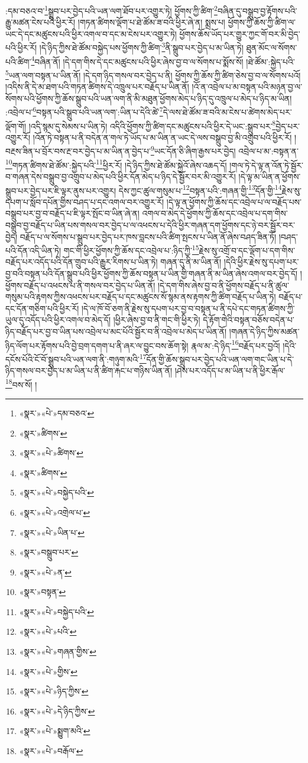 :དམ་བཅའ་བ་\footnote{«སྣར་»«པེ་»དམ་བཅའ་}སྒྲུབ་པར་བྱེད་པའི་ཡན་ལག་ཐོབ་པར་འགྱུར་ཏེ། ཕྱོགས་ཀྱི་ཚིག་\footnote{«སྣར་»ཚིགས་}བཞིན་དུ་བསྒྲུབ་བྱ་རྟོགས་པའི་རྒྱུ་མཚན་ངེས་པའི་ཕྱིར་རོ། །གཏན་ཚིགས་ལྡོག་པ་ཐེ་ཚོམ་ཟ་བའི་ཕྱིར་ཞེ་ན། སྨྲས་པ། ཕྱོགས་ཀྱི་ཆོས་ཀྱི་ཚིག་ལ་ཡང་དེ་དང་མཚུངས་པའི་ཕྱིར་འགལ་བ་དང་མ་ངེས་པར་འགྱུར་ཏེ། ཕྱོགས་ཆོས་ཡོད་པར་གྱུར་ཀྱང་གོ་བར་མི་བྱེད་པའི་ཕྱིར་རོ། །དེ་ཉིད་ཀྱིས་ཐེ་ཚོམ་བསྐྱེད་པས་ཕྱོགས་ཀྱི་ཚིག་\footnote{«སྣར་»«པེ་»ཚིགས་}ནི་སྒྲུབ་པར་བྱེད་པ་མ་ཡིན་ཏེ། ཐུན་མོང་ལ་སོགས་པའི་ཚིག་\footnote{«སྣར་»ཚིགས་}བཞིན་ནོ། །དེ་དག་གིས་དེ་དང་མཚུངས་པའི་ཕྱིར་ཞེས་བྱ་བ་ལ་སོགས་པ་སྨོས་སོ། །ཐེ་ཚོམ་:སྐྱེད་པའི་\footnote{«སྣར་»«པེ་»བསྐྱེད་པའི་}ཡན་ལག་བསྟན་པ་ཡིན་ནོ། །དེ་དག་ཉིད་གསལ་བར་བྱེད་པ་ནི། ཕྱོགས་ཀྱི་ཆོས་ཀྱི་ཚིག་ཅེས་བྱ་བ་ལ་སོགས་པའོ། །འདིས་ནི་དེ་མ་ཐག་པའི་གཏན་ཚིགས་དེ་འཁྲུལ་པར་བརྗོད་པ་ཡིན་ནོ། །འོ་ན་འབྲེལ་པ་མ་བསྟན་པའི་མཉན་བྱ་ལ་སོགས་པའི་ཕྱོགས་ཀྱི་ཆོས་སྒྲུབ་པའི་ཡན་ལག་ནི་མི་མཐུན་ཕྱོགས་མེད་པ་ཉིད་དུ་འཁྲུལ་པ་མེད་པ་ཉིད་མ་ཡིན། :འབྲེལ་པ་\footnote{«སྣར་»«པེ་»འགྲེལ་པ་}བསྟན་པའི་སྒྲུབ་པའི་ཡན་ལག་:ཡིན་པ་དེའི་ཚེ་\footnote{«སྣར་»«པེ་»ཡིན་པ་}དེ་ལས་ཐེ་ཚོམ་ཟ་བའི་མ་ངེས་པ་ཚེགས་མེད་པར་ལྡོག་གོ། །འདི་སྙམ་དུ་སེམས་པ་ཡིན་ཏེ། འདིའི་ཕྱོགས་ཀྱི་ཚིག་དང་མཚུངས་པའི་ཕྱིར་དེ་ཡང་:སྒྲུབ་པར་\footnote{«སྣར་»བསྒྲུབ་པར་}བྱེད་པར་འགྱུར་རོ། །འོན་ཏེ་བསྟན་པ་ནི་བདེན་ན་གལ་ཏེ་ཡོད་པ་མ་ཡིན་ན་ཡང་དེ་ལས་བསྒྲུབ་བྱ་མི་འགྲུབ་པའི་ཕྱིར་རོ། །བརྔས་ཟིན་པ་བྲོར་བས་རྔ་བར་བྱེད་པ་མ་ཡིན་ན་བྱེད་པ་\footnote{«སྣར་»«པེ་»ན་}ཡང་དོན་ཅི་ཞིག་རྒྱས་པར་བྱེད། འབྲེལ་པ་མ་:བསྟན་ན་\footnote{«སྣར་»བསྟན་}གཏན་ཚིགས་ཐེ་ཚོམ་:སྐྱེད་པའི་\footnote{«སྣར་»«པེ་»བསྐྱེད་པའི་}ཕྱིར་རོ། །དེ་ཉིད་ཀྱིས་ཐེ་ཚོམ་སྐྱེའོ་ཞེས་འཆད་དོ། །གལ་ཏེ་དེ་ལྟ་ན་འོན་ཏེ་སྦྱོར་བ་གཞན་དེས་བསྒྲུབ་བྱ་འགྲུབ་པ་མེད་པའི་ཕྱིར་དོན་མེད་པ་ཉིད་དེ་སྦྱོར་བར་མི་འགྱུར་རོ། །དེ་ལྟ་མ་ཡིན་ན་ཕྱོགས་སྒྲུབ་པར་བྱེད་པར་ཇི་ལྟར་ནུས་པར་འགྱུར། དེས་ཀྱང་ཚུལ་གསུམ་པ་\footnote{«སྣར་»«པེ་»པའི་}བསྟན་པའི་:གཞན་གྱི་\footnote{«སྣར་»«པེ་»གཞན་གྱིས་}དོན་གྱི་\footnote{«སྣར་»«པེ་»གྱིས་}རྗེས་སུ་དཔག་པ་སློབ་དཔོན་གྱིས་བཤད་པ་དང་འགལ་བར་འགྱུར་རོ། །དེ་ལྟ་ན་ཕྱོགས་ཀྱི་ཆོས་དང་འབྲེལ་པ་ལ་བརྗོད་པས་བསྒྲུབ་པར་བྱ་བ་བརྗོད་པ་ཇི་ལྟར་སྤོང་བ་ཡིན་ཞེ་ན། འགལ་བ་མེད་དེ་ཕྱོགས་ཀྱི་ཆོས་དང་འབྲེལ་པ་དག་གིས་བསྒྲུབ་བྱ་བརྗོད་པ་ཡིན་པས་གསལ་བར་བྱེད་པ་ལ་འཕངས་པ་དེའི་ཕྱིར་གཞན་དག་ཕྱོགས་དང་ཉེ་བར་སྦྱོར་བར་བྱེད། བརྗོད་པ་ལ་སོགས་པ་སྒྲུབ་པར་བྱེད་པར་ཁས་བླངས་པའི་ཚིག་སྤངས་པ་ཡིན་ནོ་ཞེས་བཤད་ཟིན་ཏོ། །བཤད་པའི་དོན་འདི་ཡིན་ཏེ། གང་གི་ཕྱིར་ཕྱོགས་ཀྱི་ཆོས་དང་འབྲེལ་པ་:ཉིད་ཀྱི་\footnote{«སྣར་»«པེ་»ཉིད་ཀྱིས་}རྗེས་སུ་འགྲོ་བ་དང་ལྡོག་པ་དག་གིས་བརྗོད་པར་འདོད་པའི་དོན་གྲུབ་པའི་རྒྱུར་རིགས་པ་ཡིན་ཏེ། གཞན་དུ་ནི་མ་ཡིན་ནོ། །དེའི་ཕྱིར་རྗེས་སུ་དཔག་པར་བྱ་བའི་བསྟན་པའི་དོན་སྒྲུབ་པའི་ཕྱིར་ཕྱོགས་ཀྱི་ཆོས་བསྟན་པ་ཡིན་གྱི་གཞན་ནི་མ་ཡིན་ཞེས་འགལ་བར་བྱེད་དོ། །ཕྱོགས་བརྗོད་པ་འཕངས་པ་ནི་གསལ་བར་བྱེད་པ་ཡིན་ནོ། །དེ་དག་གིས་ཞེས་བྱ་བ་ནི་ཕྱོགས་བརྗོད་པ་ནི་ཚུལ་གསུམ་པའི་རྟགས་ཀྱིས་འཕངས་པར་བརྗོད་པ་དང་མཚུངས་སོ་སྙམ་ནས་རྟགས་ཀྱི་ཚིག་བརྗོད་པ་ཡིན་ཏེ། བརྗོད་པ་དང་དོན་གཅིག་པའི་ཕྱིར་རོ། །དེ་ལ་ཁོ་བོ་ཅག་ནི་རྗེས་སུ་དཔག་པར་བྱ་བ་བསྟན་པ་ནི་དཔེ་དང་གཏན་ཚིགས་ཀྱི་ཡུལ་དུ་འདོད་པའི་ཕྱིར་འགལ་བ་མེད་དོ། །ཕྱིར་ཞེས་བྱ་བ་ནི་གང་གི་ཕྱིར་ཏེ། དེ་རྟོག་གེའི་བསྟན་བཅོས་བདེན་པ་ཉིད་བརྗོད་པར་བྱ་བ་ཡིན་པས་འབྲེལ་པ་མང་པོའི་སྦྱོར་བ་ནི་འབྲེལ་པ་མེད་པ་ཡིན་ནོ། །གཞན་དེ་ཉིད་ཀྱིས་མཚན་ཉིད་ལོག་པར་རྟོགས་པའི་བྱེ་བྲག་དགག་པ་ནི་ཞར་ལ་བྱུང་བས་ཆོག་སྟེ། རྣལ་མ་:དེ་ཉིད་\footnote{«སྣར་»«པེ་»དེ་ཉིད་ཀྱིས་}བརྗོད་པར་བྱའོ། །དེའི་དངོས་པོའི་ངོ་བོ་སྒྲུབ་པའི་ཡན་ལག་ནི་:གཉུག་མའི་\footnote{«སྣར་»«པེ་»སྨྱུག་མའི་}དོན་གྱི་ཆོས་སྒྲུབ་པར་བྱེད་པའི་ཡན་ལག་གང་ཡིན་པ་དེ་ཉིད་གསལ་བར་བྱེད་པ་མ་ཡིན་པ་ནི་ཚིག་རྐང་པ་གཉིས་ཡིན་ནོ། །ཤེས་པར་འདོད་པ་མ་ཡིན་པ་ནི་ཕྱིར་རྒོལ་\footnote{«སྣར་»«པེ་»བརྒོལ་}བས་སོ། །
